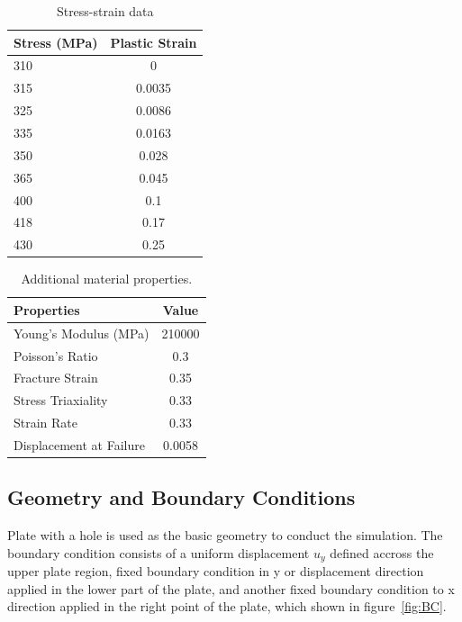 \documentclass[12pt]{article}
\begin{document}
\begin{table}[H]
\centering
\caption{Stress-strain data}
\label{tab:FlowCurve}
\begin{tabular}{lc}
    \toprule
    Stress (MPa) & Plastic Strain \\
    \midrule
    310 & 0  \\[0.5em]
    315 & 0.0035  \\[0.5em]
    325 & 0.0086  \\[0.5em]
    335 & 0.0163  \\[0.5em]
    350 & 0.028  \\[0.5em]
    365 & 0.045  \\[0.5em]
    400 & 0.1  \\[0.5em]
    418 & 0.17  \\[0.5em]
    430 & 0.25  \\
    \bottomrule
\end{tabular}
\end{table}

\begin{table}[H]
\centering
\caption{Additional material properties.}
\label{tab:Properties}
\begin{tabular}{lc}
    \toprule
    Properties & Value \\ [0.5em]
    \midrule
    Young's Modulus (MPa) & 210000  \\[0.5em]
    Poisson's Ratio & 0.3  \\[0.5em]
    Fracture Strain & 0.35 \\[0.5em]
    Stress Triaxiality & 0.33  \\[0.5em]
    Strain Rate & 0.33  \\[0.5em]
    Displacement at Failure &  0.0058  \\[0.5em]
    \bottomrule
\end{tabular}
\end{table}






\subsection{Geometry and Boundary Conditions}

\hspace{1em} Plate with a hole is used as the basic
geometry to conduct the simulation. The boundary condition consists of a uniform displacement $u_y$ defined accross the
upper plate region, fixed boundary condition in y or displacement direction applied in the lower part of the plate, and another fixed boundary condition
to x direction applied in the right point of the plate, which shown in figure~\ref{fig:BC}.   
\end{document}

